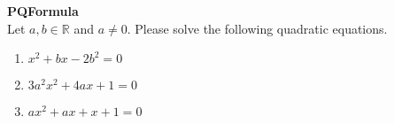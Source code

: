 \textbf{PQFormula}\\
Let $a,b \in \mathbb{R}$ and $a\neq 0$. Please solve the following quadratic equations.
\begin{enumerate}
	\item $x^2 + bx - 2b^2 = 0$
	\item $3a^2x^2 + 4ax + 1  = 0$
	\item $ax^2 + ax + x + 1 = 0$
\end{enumerate}